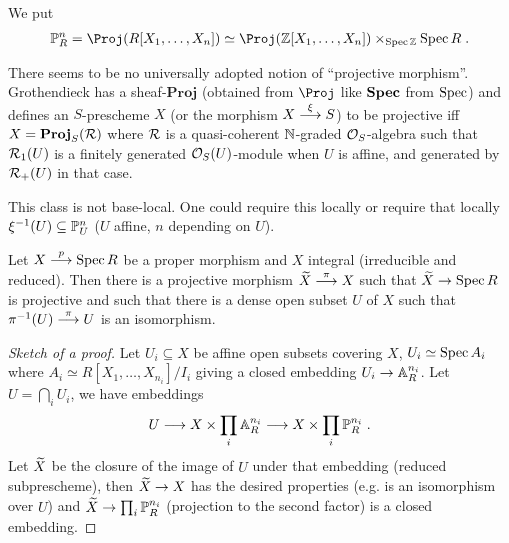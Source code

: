 \documentclass[a4paper,parskip=half,numbers=enddot, DIV=12]{scrreprt}
\begin{document}
\begin{example}
	We put
    \begin{align*}
        \IP^n_R = \Proj(R[X_1,\ldots, X_n])\simeq \Proj(\IZ[X_1,\ldots,X_n])\times_{\Spec \IZ}\Spec R\;.
    \end{align*}
\end{example}
\begin{rem}
    There seems to be no universally adopted notion of ``projective morphism''. Grothendieck has a sheaf-$\mathbf{Proj}$ (obtained from $\Proj$ like $\operatorname{\mathbf{Spec}}$ from $\operatorname{Spec}$) and defines an $S$-prescheme $X$ (or the morphism $X\morphism[\xi] S$) to be projective iff $X= \mathbf{Proj}_S(\mathcal{R})$ where $\mathcal{R}$ is a quasi-coherent $\mathbb{N}$-graded $\mathcal{O}_S$-algebra such that $\mathcal{R}_1(U)$ is a finitely generated $\mathcal{O}_S(U)$-module when $U$ is affine, and generated by $\mathcal{R}_+(U)$ in that case.
    
    This class is not base-local. One could require this locally or require that locally $\xi^{-1}(U) \subseteq \mathbb{P}^n_U$ ($U$ affine, $n$ depending on $U$).
\end{rem}
\begin{prop}
    Let $X\morphism[p] \Spec R$ be a proper morphism and $X$ integral (irreducible and reduced). Then there is a projective morphism $\snake X\morphism[\pi] X$ such that $\snake X\morphism \Spec R$ is projective and such that there is a dense open subset $U$ of $X$ such that $\pi^{-1}(U) \morphism[\pi] U$ is an isomorphism.
\end{prop}
\begin{proof}[Sketch of a proof]
    Let $U_i\subseteq X$ be affine open subsets covering $X$, $U_i\simeq \operatorname{Spec} A_i$ where $A_i\simeq R[X_1,\ldots, X_{n_i}]/I_i$ giving a closed embedding $U_i\morphism \IA^{n_i}_R$. Let $U = \bigcap_i U_i$, we have embeddings 
    \begin{align*}
        U\morphism X\times \prod_i \IA^{n_i}_R\morphism X\times\prod_i \IP^{n_i}_R\;.
    \end{align*}
    Let $\snake X$ be the closure of the image of $U$ under that embedding (reduced subprescheme), then $\snake X\morphism X$ has the desired properties (e.g. is an isomorphism over $U$) and $\snake X\morphism \prod_i \IP^{n_i}_R$ (projection to the second factor) is a closed embedding.
\end{proof}
\end{document}
